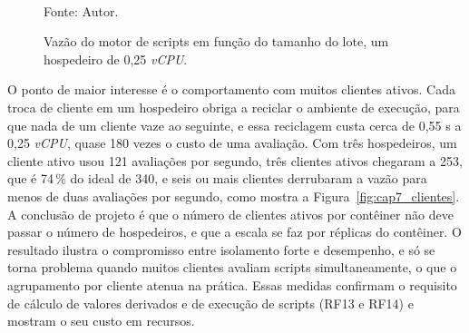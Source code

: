 \begin{figure}[H]
    \centering
    \caption{Vazão do motor de scripts em função do tamanho do lote, um hospedeiro de 0,25 \emph{vCPU}.}
    \label{fig:cap7_lote}
    \vspace{0.4cm}
    \vspace{0.2cm} \\
    Fonte: Autor.
\end{figure}

\par O ponto de maior interesse é o comportamento com muitos clientes ativos. Cada troca de cliente em um hospedeiro obriga a reciclar o ambiente de execução, para que nada de um cliente vaze ao seguinte, e essa reciclagem custa cerca de 0,55 s a 0,25 \emph{vCPU}, quase 180 vezes o custo de uma avaliação. Com três hospedeiros, um cliente ativo usou 121 avaliações por segundo, três clientes ativos chegaram a 253, que é 74\,\% do ideal de 340, e seis ou mais clientes derrubaram a vazão para menos de duas avaliações por segundo, como mostra a Figura~\ref{fig:cap7_clientes}. A conclusão de projeto é que o número de clientes ativos por contêiner não deve passar o número de hospedeiros, e que a escala se faz por réplicas do contêiner. O resultado ilustra o compromisso entre isolamento forte e desempenho, e só se torna problema quando muitos clientes avaliam scripts simultaneamente, o que o agrupamento por cliente atenua na prática. Essas medidas confirmam o requisito de cálculo de valores derivados e de execução de scripts (RF13 e RF14) e mostram o seu custo em recursos.


